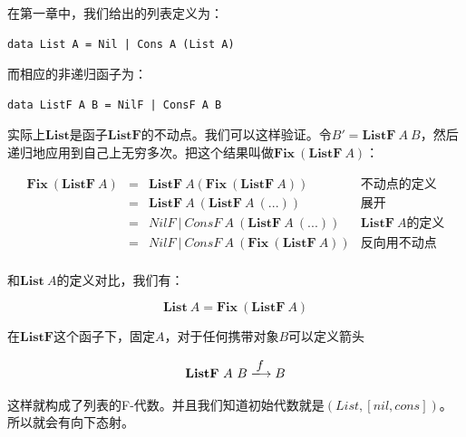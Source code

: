 \documentclass[b5paper]{ctexart}
\begin{document}
\begin{example}
在第一章中，我们给出的列表定义为：

\lstset{frame=none}
\begin{lstlisting}
data List A = Nil | Cons A (List A)
\end{lstlisting}

而相应的非递归函子为：

\begin{lstlisting}
data ListF A B = NilF | ConsF A B
\end{lstlisting}

实际上$\mathbf{List}$是函子$\mathbf{ListF}$的不动点。我们可以这样验证。令$B' = \mathbf{ListF}\ A\ B$，然后递归地应用到自己上无穷多次。把这个结果叫做$\mathbf{Fix}\ (\mathbf{ListF}\ A)$：

\[
\begin{array}{rcll}
\mathbf{Fix}\ (\mathbf{ListF}\ A)
& = & \mathbf{ListF}\ A (\mathbf{Fix}\ (\mathbf{ListF}\ A)) & \text{不动点的定义} \\
& = & \mathbf{ListF}\ A\ (\mathbf{ListF}\ A\ (...)) & \text{展开} \\
& = & NilF\ |\ ConsF\ A\ (\mathbf{ListF}\ A\ (...)) & \mathbf{ListF}\ A \text{的定义} \\
& = & NilF\ |\ ConsF\ A\ (\mathbf{Fix}\ (\mathbf{ListF}\ A)) & \text{反向用不动点} \\
\end{array}
\]

和$\mathbf{List}\ A$的定义对比，我们有：

\[
\mathbf{List}\ A = \mathbf{Fix}\ (\mathbf{ListF}\ A)
\]

在$\mathbf{ListF}$这个函子下，固定$A$，对于任何携带对象$B$可以定义箭头

\[
\mathbf{ListF}\ A\ B \arrowto{f} B
\]

这样就构成了列表的F-代数。并且我们知道初始代数就是$(List, [nil, cons])$。所以就会有向下态射。

\begin{center}
\end{center}


\end{example}
\end{document}

